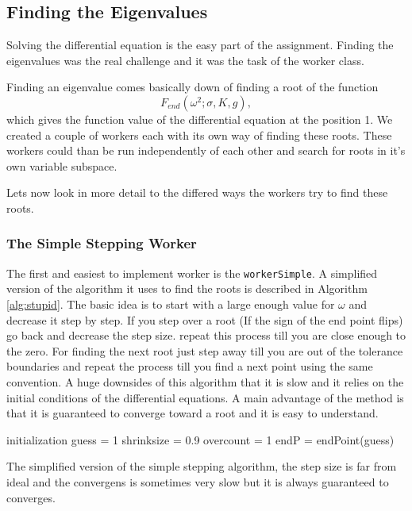 \subsection{Finding the Eigenvalues}
Solving the differential equation is the easy part of the assignment.
Finding the eigenvalues was the real challenge and it was the task of the worker class.

Finding an eigenvalue comes basically down of finding a root of the function
\begin{equation}
F_{end}(\omega^2;\sigma,K,g),
\end{equation}
which gives the function value of the differential equation at the position 1.
We created a couple of workers each with its own way of finding these roots.
These workers could than be run independently of each other and search for roots in it's own variable subspace.

Lets now look in more detail to the differed ways the workers try to find these roots.

\subsubsection{The Simple Stepping Worker}

The first and easiest to implement worker is the \verb|workerSimple|.
A simplified version of the  algorithm it uses to find the roots is described in Algorithm \ref{alg:stupid}.
The basic idea is to start with a large enough value for $ \omega $ and decrease it step by step.
If you step over a root (If the sign of the end point flips) go back and decrease the step size.
repeat this process till you are close enough to the zero.
For finding the next root just step away till you are out of the tolerance boundaries and repeat the process till you find a next point using the same convention.
A huge downsides of this algorithm that it is slow and it relies on the initial conditions of the differential equations.
A main advantage of the method is that it is guaranteed to converge toward a root and it is easy to understand.

\begin{algorithm}[h!]
 initialization\;
 guess = 1\;
 shrinksize = 0.9\;
 overcount = 1\;
 endP = endPoint(guess)\;
 
 \caption{The simplified version of the simple stepping algorithm, the step size is far from ideal and the convergens is sometimes very slow but it is always guaranteed to converges.}
 \label{alg:stupid}
\end{algorithm}

